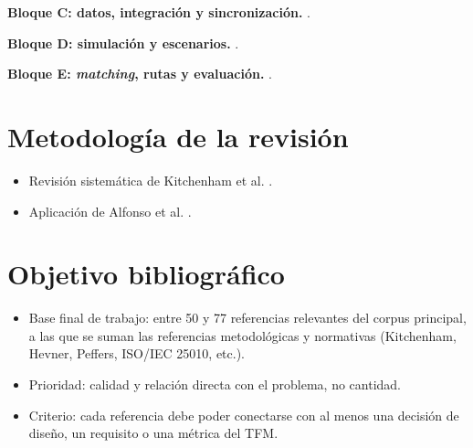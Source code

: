 \noindent\textbf{Bloque C: datos, integración y sincronización.} \cite{C1,C3,C8}.

\noindent\textbf{Bloque D: simulación y escenarios.} \cite{D2,D4,D10,D12,D14,D15}.

\noindent\textbf{Bloque E: \textit{matching}, rutas y evaluación.} \cite{E16,E17,E19,E20,E21,E22}.

\section{Metodología de la revisión}

\begin{itemize}
    \item Revisión sistemática de Kitchenham et al. \cite{Kitchenham2009}.
    \item Aplicación de Alfonso et al. \cite{Alfonso2021}.
\end{itemize}

\section{Objetivo bibliográfico}

\begin{itemize}
    \item Base final de trabajo: entre 50 y 77 referencias relevantes del corpus principal, a las que se suman las referencias metodológicas y normativas (Kitchenham, Hevner, Peffers, ISO/IEC 25010, etc.).
    \item Prioridad: calidad y relación directa con el problema, no cantidad.
    \item Criterio: cada referencia debe poder conectarse con al menos una decisión de diseño, un requisito o una métrica del TFM.
\end{itemize}
